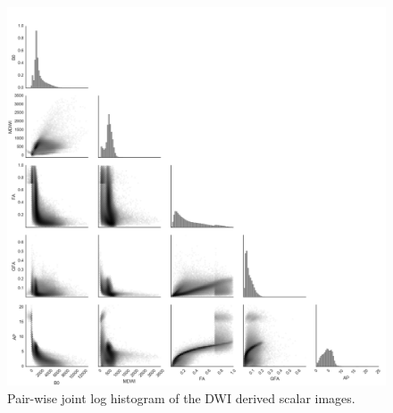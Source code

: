 \begin{figure}[p]
\includegraphics[width=\linewidth]{figure3}
\caption{Pair-wise joint log histogram of the DWI derived scalar images.}
\centering
\label{fig:APfigure3}
\end{figure}

